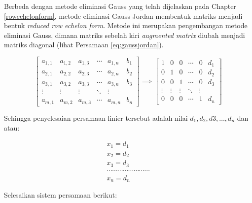 \documentclass[]{book}
\theoremstyle{definition}
\theoremstyle{definition}
\theoremstyle{definition}
\theoremstyle{remark}
\let\BeginKnitrBlock\begin \let\EndKnitrBlock\end
\begin{document}
Berbeda dengan metode eliminasi Gauss yang telah dijelaskan pada Chapter \ref{rowechelonform}, metode eliminasi Gauss-Jordan membentuk matriks menjadi bentuk \emph{reduced row echelon form}. Metode ini merupakan pengembangan metode eliminasi Gauss, dimana matriks sebelah kiri \emph{augmented matrix} diubah menjadi matriks diagonal (lihat Persamaan \eqref{eq:gaussjordan}).

\begin{equation}
\begin{bmatrix}
     a_{1,1} & a_{1,2} & a_{1,3} &\cdots& a_{1,n} & b_1     \\[0.3em]
     a_{2,1} & a_{2,2} & a_{2,3} &\cdots& a_{2,n} & b_2     \\[0.3em]
     a_{3,1} & a_{3,2} & a_{3,3} &\cdots& a_{3,n} & b_3     \\[0.3em]
     \vdots  & \vdots  & \vdots &\ddots& \vdots             \\[0.3em]
     a_{m,1} & a_{m,2} & a_{m,3} &\cdots& a_{m,n} & b_n
     \end{bmatrix}
\implies
\begin{bmatrix}
     1       & 0       & 0       &\cdots& 0       & d_1     \\[0.3em]
     0       & 1       & 0       &\cdots& 0       & d_2     \\[0.3em]
     0       & 0       & 1       &\cdots& 0       & d_3     \\[0.3em]
     \vdots  & \vdots  & \vdots &\ddots& \vdots             \\[0.3em]
     0       & 0       & 0      &\cdots& 1        & d_n
     \end{bmatrix}
  \label{eq:gaussjordan}
\end{equation}

Sehingga penyelesaian persamaan linier tersebut adalah nilai \(d_1,d_2,d3,\dots,d_n\) dan atau:

\begin{equation}
\begin{matrix}
  x_1=d_1 \\
  x_2=d_2 \\
  x_3=d_3 \\
  \cdots\cdots\cdots\cdots\cdots\cdots\cdots\cdots       \\
  x_n=d_n
   \end{matrix}
  \label{eq:gaussjordansolution}
\end{equation}

\BeginKnitrBlock{example}
\protect\hypertarget{exm:gaussjordanexm}{}{\label{exm:gaussjordanexm} }Selesaikan sistem persamaan berikut:
\EndKnitrBlock{example}
\end{document}
